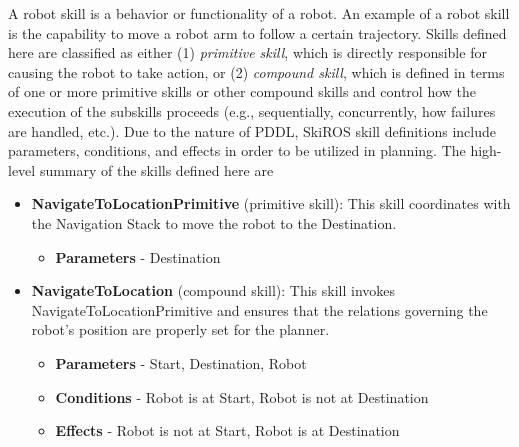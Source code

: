 A robot skill is a behavior or functionality of a robot. An
example of a robot skill is the capability to move a robot arm to follow a certain trajectory. Skills defined here are classified as either (1) {\it primitive skill}, which is
directly responsible for causing the robot to take action, or (2) {\it compound skill}, which is defined in terms of one or more primitive skills or other compound skills and control how the execution of the subskills proceeds (e.g., sequentially, concurrently, how failures are handled, etc.). Due to the nature of PDDL, SkiROS skill definitions include parameters, conditions, and effects in order to be utilized in planning. The high-level summary of the skills defined here are%
\begin{itemize}
    \item {\bf NavigateToLocationPrimitive} (primitive skill): This skill coordinates with the Navigation Stack to move the robot to the Destination.
    \begin{itemize}
        \item {\bf Parameters} - Destination
    \end{itemize}
    
    \item {\bf NavigateToLocation} (compound skill): This skill invokes NavigateToLocationPrimitive and ensures that the relations governing the robot's position are properly set for the planner.
    \begin{itemize}
        \item {\bf Parameters} - Start, Destination, Robot
        \item {\bf Conditions} - Robot is at Start, Robot is not at Destination
        \item {\bf Effects} - Robot is not at Start, Robot is at Destination
    \end{itemize}
    

\end{itemize}
